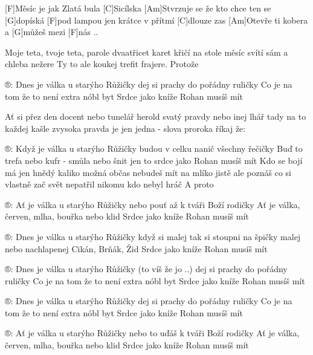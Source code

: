 [F]Měsíc je jak Zlatá bula [C]Sicílska
[Am]Stvrzuje se že kto chce ten se [G]dopíská
[F]pod lampou jen krátce v přítmí [C]dlouze zas
[Am]Otevře ti kobera a [G]můžeš mezi [F]nás .. 

Moje teta, tvoje teta, parole
dvaatřicet karet křičí na stole
měsíc svítí sám a chleba nežere
Ty to ale koukej trefit frajere.
Protože

®: Dnes je válka u starýho Růžičky
dej si prachy do pořádny ruličky
Co je na tom že to není extra nóbl byt
Srdce jako kníže Rohan musíš mít 

Ať si přez den docent nebo tunelář
herold svatý pravdy nebo inej lhář
tady na to každej kašle zvysoka
pravda je jen jedna - slova proroka říkaj že:

®: Když je válka u starýho Růžičky
budou v celku nanič všechny řečičky
Buď to trefa nebo kufr - smůla nebo šnit
jen to srdce jako Rohan musíš mít
\slpc
Kdo se bojí má jen hnědý kaliko
možná občas nebudeš mít na mlíko
jistě ale poznáš co si vlastně zač
svět nepatřil nikomu kdo nebyl hráč
A proto

®: Ať je válka u starýho Růžičky
nebo pouť až k tváři Boží rodičky
Ať je válka, červen, mlha, bouřka nebo klid
Srdce jako kníže Rohan musíš mít

®: Dnes je válka u starýho Růžičky
když si malej tak si stoupni na špičky
malej nebo nachlapenej Cikán, Brňák, Žid
Srdce jako kníže Rohan musíš mít

®: Dnes je válka u starýho Růžičky (to víš že jo ..)
dej si prachy do pořádny ruličky
Co je na tom že to není extra nóbl byt
Srdce jako kníže Rohan musíš mít

®: Dnes je válka u starýho Růžičky
dej si prachy do pořádny ruličky
Co je na tom že to není extra nóbl byt
Srdce jako kníže Rohan musíš mít

®: Ať je válka u starýho Růžičky
nebo to uďáš k tváři Boží rodičky
Ať je válka, červen, mlha, bouřka nebo klid
Srdce jako kníže Rohan musíš mít
